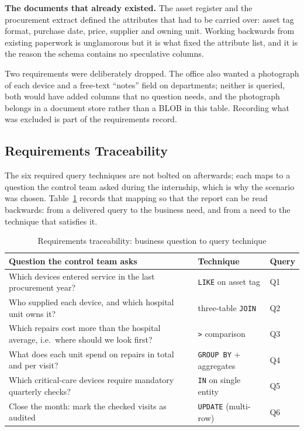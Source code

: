 \documentclass[conference]{IEEEtran}
\begin{document}
\textbf{The documents that already existed.} The asset register and the
procurement extract defined the attributes that had to be carried over:
asset tag format, purchase date, price, supplier and owning unit. Working
backwards from existing paperwork is unglamorous but it is what fixed the
attribute list, and it is the reason the schema contains no speculative
columns.

Two requirements were deliberately dropped. The office also wanted a
photograph of each device and a free-text ``notes'' field on departments;
neither is queried, both would have added columns that no question needs, and
the photograph belongs in a document store rather than a BLOB in this table.
Recording what was excluded is part of the requirements record.

\subsection{Requirements Traceability}
The six required query techniques are not bolted on afterwards; each maps to
a question the control team asked during the internship, which is why the
scenario was chosen. Table~\ref{tab:trace} records that mapping so that the
report can be read backwards: from a delivered query to the business need,
and from a need to the technique that satisfies it.

\begin{table}[!t]
\caption{Requirements traceability: business question to query technique}
\label{tab:trace}
\small
\begin{tabular}{p{4.0cm}p{1.8cm}p{1.2cm}}
\toprule
\textbf{Question the control team asks} & \textbf{Technique} & \textbf{Query} \\
\midrule
Which devices entered service in the last procurement year? & \texttt{LIKE} on asset tag & Q1 \\
Who supplied each device, and which hospital unit owns it? & three-table \texttt{JOIN} & Q2 \\
Which repairs cost more than the hospital average, i.e.\ where should we look first? & \texttt{>} comparison & Q3 \\
What does each unit spend on repairs in total and per visit? & \texttt{GROUP BY} + aggregates & Q4 \\
Which critical-care devices require mandatory quarterly checks? & \texttt{IN} on single entity & Q5 \\
Close the month: mark the checked visits as audited & \texttt{UPDATE} (multi-row) & Q6 \\
\bottomrule
\end{tabular}
\end{table}
\end{document}
